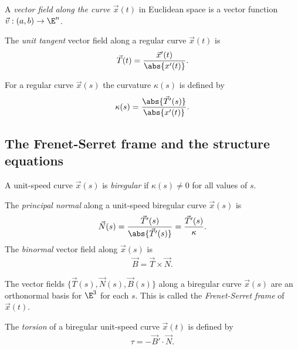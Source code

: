 \documentclass{article}
\begin{document}
\begin{definition}
	A \emph{vector field along the curve $\vec x(t)$} in Euclidean space is a vector
	function $\vec v:(a,b)\to\E^n$.
\end{definition}

\begin{definition}
	The \emph{unit tangent} vector field along a regular curve $\vec x(t)$ is
	\begin{align*}
		\vec T(t) = \frac{\vec x'(t)}{\abs{x'(t)}}.
	\end{align*}
\end{definition}

\begin{definition}
	For a regular curve $\vec x(s)$ the curvature $\kappa(s)$ is defined by
	\begin{align*}
		\kappa(s) = \frac{\abs{\vec T'(s)}}{\abs{x'(t)}}.
	\end{align*}
\end{definition}

\subsection{The Frenet-Serret frame and the structure equations}

\begin{definition}
	A unit-speed curve $\vec x(s)$ is \emph{biregular} if $\kappa(s)\not=0$ for
	all values of $s$.
\end{definition}

\begin{definition}
	The \emph{principal normal} along a unit-speed biregular curve $\vec x(s)$ is
	\begin{align*}
		\vec N(s) = \frac{\vec T'(s)}{\abs{\vec T'(s)}}=\frac{\vec T'(s)}{\kappa}.
	\end{align*}
	The \emph{binormal} vector field along $\vec x(s)$ is
	\begin{align*}
		\vec B = \vec T \times \vec N.
	\end{align*}
\end{definition}

\begin{proposition}[Notes 3.14]
	The vector fields $\{\vec T(s), \vec N(s), \vec B(s)\}$ along a biregular curve
	$\vec x(s)$ are an orthonormal basis for $\E^3$ for each $s$. This is called the
	\emph{Frenet-Serret frame} of $\vec x(t)$.
\end{proposition}

\begin{definition}
	The \emph{torsion} of a biregular unit-speed curve $\vec x(t)$ is defined by
	\begin{align*}
		\tau = - \vec B' \cdot \vec N.
	\end{align*}
\end{definition}
\end{document}
